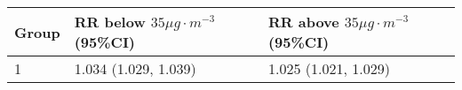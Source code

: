 \begin{tabular}{lll}
  \hline
Group & RR below $35 \mu g \cdot m^{-3}$ (95\%CI) & RR above $35 \mu g \cdot m^{-3}$ (95\%CI) \\ 
  \hline
   1 & 1.034 (1.029, 1.039) & 1.025 (1.021, 1.029) \\ 
   \hline
\end{tabular}

